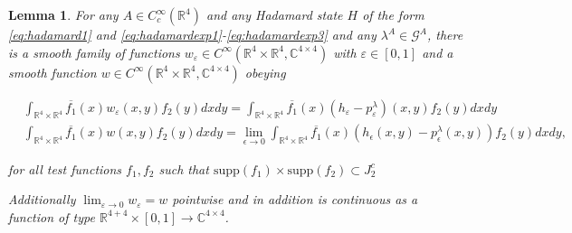 \documentclass[b5paper,draft,openbib,12pt]{memoir}
\newtheorem{Lemma}[Def]{Lemma}
\begin{document}
\begin{Lemma}\label{lem:pointwise}
For any \(A\in C_c^\infty(\mathbb{R}^4)\) and any Hadamard state \(H\) of the form \eqref{eq:hadamard1} and \eqref{eq:hadamardexp1}-\eqref{eq:hadamardexp3}
and any \(\lambda^A \in \mathcal{G}^A\),  there is a smooth family of
functions \(w_\varepsilon\in C^\infty(\mathbb{R}^4\times \mathbb{R}^4,\mathbb{C}^{4\times4})\) with \(\varepsilon \in [0,1]\) and a smooth function 
  \(w\in C^\infty(\mathbb{R}^4\times \mathbb{R}^4,\mathbb{C}^{4\times 4})\)  obeying
  
\begin{align}
&\int_{\mathbb{R}^4\times\mathbb{R}^4} \overline{f_1}(x) w_\varepsilon(x,y) f_2(y)dxdy =
\int_{\mathbb{R}^4\times\mathbb{R}^4} \overline{f_1}(x) (h_\varepsilon - p_\varepsilon^\lambda)(x,y) f_2(y)dxdy\\
&\int_{\mathbb{R}^4\times\mathbb{R}^4} \overline{f_1}(x) w(x,y)f_2(y)dxdy =
\lim_{\epsilon\rightarrow 0}\int_{\mathbb{R}^4\times\mathbb{R}^4} \overline{f_1}(x)(h_\epsilon (x,y)-p^\lambda_\epsilon(x,y)) f_2(y)dxdy,
\end{align}

for all test functions \(f_1,f_2\) such that \(\mathrm{supp}(f_1)\times\mathrm{supp}(f_2)\subset J_2^c\)
  
Additionally \(\lim_{\varepsilon \rightarrow 0}w_\varepsilon=w\) pointwise and in addition 
is continuous as a function of type \(\mathbb{R}^{4+4} \times[0,1]\rightarrow \mathbb{C}^{4\times 4}\).
\end{Lemma}
\end{document}
